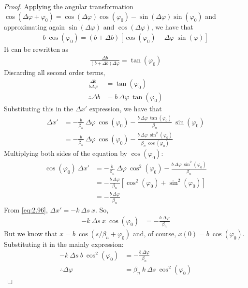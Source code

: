 \begin{proof}
	Applying the angular transformation $\cos(\Delta \varphi + \varphi_0) = \cos(\Delta \varphi)\cos(\varphi_0) - \sin(\Delta \varphi)\sin(\varphi_0)$ and approximating again $\sin(\Delta \varphi)$ and $\cos(\Delta \varphi)$, we have that
	\begin{align*}
		b\ \cos(\varphi_0) = (b+\Delta b)[\cos(\varphi_0)-\Delta \varphi\ \sin(\varphi)]
	\end{align*}
	It can be rewritten as
	\begin{align*}
		\frac{\Delta b}{(b+\Delta b)\Delta \varphi} = \tan(\varphi_0)
	\end{align*}
	Discarding all second order terms,
	\begin{align*}
		\frac{\Delta b}{b \Delta \varphi} &= \tan(\varphi_0)\\
		\therefore \Delta b &= b\ \Delta \varphi\ \tan(\varphi_0)
	\end{align*}
	Substituting this in the  $\Delta x'$ expression, we have that
	\begin{align*}
		\Delta x' &= -\frac{b}{\beta_n}\ \Delta \varphi\ \cos(\varphi_0) - \frac{b\ \Delta \varphi\ \tan(\varphi_0)}{\beta_n}\ \sin(\varphi_0)\\
				  &= -\frac{b}{\beta_n}\ \Delta \varphi\ \cos(\varphi_0) - \frac{b\ \Delta \varphi\ \sin^2(\varphi_0)}{\beta_n\ \cos(\varphi_0)}
	\end{align*}
	Multiplying both sides of the equation by $\cos(\varphi_0)$:
	\begin{align*}
		\cos(\varphi_0)\ \Delta x' &= -\frac{b}{\beta_n}\ \Delta \varphi\ \cos^2(\varphi_0) - \frac{b\ \Delta \varphi\ \sin^2(\varphi_0)}{\beta_n}\\
			&= -\frac{b\ \Delta \varphi}{\beta_n}[\cos^2(\varphi_0)+\sin^2(\varphi_0)]\\
			&= -\frac{b\ \Delta \varphi}{\beta_n}
	\end{align*}
	From \eqref{eq:2.96}, $\Delta x' = -k\ \Delta s\ x$. So,
	\begin{align*}
		-k\ \Delta s\ x\ \cos(\varphi_0) &= -\frac{b\ \Delta \varphi}{\beta_n}
	\end{align*}
	But we know that $x = b\ \cos(s/\beta_n + \varphi_0)$ and, of course, $x(0) = b\ \cos(\varphi_0)$. Substituting it in the mainly expression:
	\begin{align*}
		-k\ \Delta s\ b\ \cos^2(\varphi_0) &= -\frac{b\ \Delta \varphi}{\beta_n}\\
		\therefore \Delta \varphi &= \beta_n\ k\ \Delta s\ \cos^2(\varphi_0)
	\end{align*}

\end{proof}
